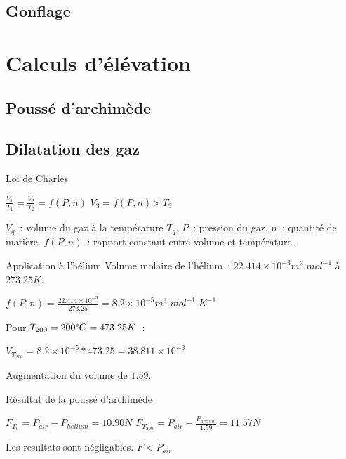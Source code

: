 \documentclass{beamer}
\begin{document}
\subsection{Gonflage}

\section{Calculs d'élévation}

\subsection{Poussé d'archimède}
\subsection{Dilatation des gaz}

\begin{frame}{Loi de Charles}
  \begin{center}
    $\displaystyle{\frac{V_1}{T_1} = \frac{V_2}{T_2} = f(P, n)}$
    $\displaystyle{V_3 = f(P, n) \times T_3}$
  \end{center}
  $V_q$~: volume du gaz à la température $T_q$. $P$~: pression du gaz. $n$~: quantité de matière. $f(P, n)$~: rapport constant entre volume et température.
\end{frame}

\begin{frame}{Application à l'hélium}
  Volume molaire de l'hélium~: $22.414\times 10^{-3} m^3.mol^{-1}$ à $273.25K$.
  \begin{center}
    $\displaystyle{f(P, n) = \frac{22.414\times 10^{-3}}{273.25} = 8.2\times 10^{-5} m^3.mol^{-1}.K^{-1}}$
  \end{center}
  Pour $T_{200} = 200 \degree C = 473.25 K$~:
  \begin{center}
    $\displaystyle{V_{T_{200}} = 8.2\times 10^{-5} * 473.25 = 38.811 \times 10^{-3}}$
  \end{center}
  Augmentation du volume de $1.59$.
\end{frame}

\begin{frame}{Résultat de la poussé d'archimède}
  \begin{center}
    $\displaystyle{F_{T_0} = P_{air} - P_{helium} = 10.90 N}$
    \bigbreak
    $\displaystyle{F_{T_{200}} = P_{air} - \frac{P_{helium}}{1.59} = 11.57 N}$ \\
  \end{center}
  Les resultats sont négligables. $F < P_{air}$
\end{frame}
\end{document}
